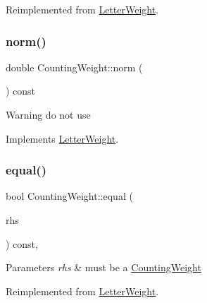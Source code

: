 Reimplemented from \mbox{\hyperlink{group__weight_ga53200866c20ae5e4aae7ab8acd8f3ad0}{Letter\+Weight}}.

\mbox{\label{group__weight_gabb8ca43a6821de970e8f6b23c848c804}} 
\subsubsection{\texorpdfstring{norm()}{norm()}\hspace{0.1cm}{\footnotesize\ttfamily [1/3]}}
{\footnotesize\ttfamily double Counting\+Weight\+::norm (\begin{DoxyParamCaption}{ }\end{DoxyParamCaption}) const\hspace{0.3cm}{\ttfamily [virtual]}}

\begin{DoxyWarning}{Warning}
do not use 
\end{DoxyWarning}


Implements \mbox{\hyperlink{classLetterWeight}{Letter\+Weight}}.

\mbox{\label{group__weight_ga33f06a811859bdbbf1c0ad2e34299df9}} 
\subsubsection{\texorpdfstring{equal()}{equal()}\hspace{0.1cm}{\footnotesize\ttfamily [1/4]}}
{\footnotesize\ttfamily bool Counting\+Weight\+::equal (\begin{DoxyParamCaption}\item[{const \mbox{\hyperlink{classLetterWeight}{Letter\+Weight}} $\ast$}]{rhs }\end{DoxyParamCaption}) const\hspace{0.3cm}{\ttfamily [protected]}, {\ttfamily [virtual]}}


\begin{DoxyParams}{Parameters}
{\em rhs} & must be a \mbox{\hyperlink{classCountingWeight}{Counting\+Weight}} \\
\hline
\end{DoxyParams}


Reimplemented from \mbox{\hyperlink{group__weight_gaf00322921db3c5212f8d5ca63081d689}{Letter\+Weight}}.

